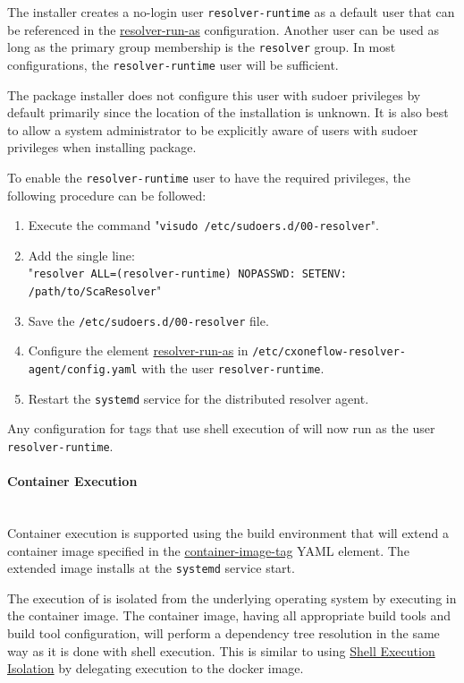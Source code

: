 The installer creates a no-login user \texttt{resolver-runtime} as a default user that can be referenced in the \hyperref[sec:agent-resolver-run-as]{resolver-run-as}
configuration.  Another user can be used as long as the primary group membership is the \texttt{resolver} group.  In most configurations, 
the \texttt{resolver-runtime} user will be sufficient.

The package installer does not configure this user with sudoer privileges by default primarily since the location of the \scaresolver
installation is unknown.  It is also best to allow a system administrator to be explicitly aware of users with sudoer privileges when installing
package.

To enable the \texttt{resolver-runtime} user to have the required privileges, the following procedure can be followed:

\begin{enumerate}
  \item Execute the command "\texttt{visudo /etc/sudoers.d/00-resolver}".
  \item Add the single line:\\"\texttt{resolver ALL=(resolver-runtime) NOPASSWD: SETENV: /path/to/ScaResolver}"
  \item Save the \texttt{/etc/sudoers.d/00-resolver} file.
  \item Configure the element \hyperref[sec:agent-resolver-run-as]{resolver-run-as} in \texttt{/etc/cxoneflow-resolver-agent/config.yaml} 
  with the user \texttt{resolver-runtime}.
  \item Restart the \texttt{systemd} service for the distributed resolver agent.
\end{enumerate}

Any configuration for tags that use shell execution of \scaresolver will now run as the user\\\texttt{resolver-runtime}.

\paragraph{Container Execution}
\noindent\\Container execution is supported using the \toolkit build environment that will extend a container image
specified in the \hyperref[sec:agent-container-image-tag]{container-image-tag} YAML element.  The extended image
installs \scaresolver at the \texttt{systemd} service start.

The execution of \scaresolver is isolated from the underlying operating system by executing in the container image.
The container image, having all appropriate build tools and build tool configuration, will perform a dependency
tree resolution in the same way as it is done with shell execution.  This is similar to using
\hyperref[par:shell-agent-isolation]{Shell Execution Isolation} by delegating execution to the docker image.

